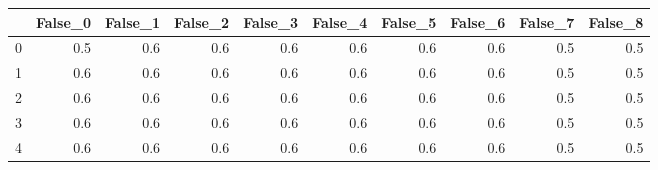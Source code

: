 \begin{tabular}{lrrrrrrrrr}
\toprule
{} &  False\_0 &  False\_1 &  False\_2 &  False\_3 &  False\_4 &  False\_5 &  False\_6 &  False\_7 &  False\_8 \\ \hline
\midrule
0 &      0.5 &      0.6 &      0.6 &      0.6 &      0.6 &      0.6 &      0.6 &      0.5 &      0.5 \\ \hline
1 &      0.6 &      0.6 &      0.6 &      0.6 &      0.6 &      0.6 &      0.6 &      0.5 &      0.5 \\ \hline
2 &      0.6 &      0.6 &      0.6 &      0.6 &      0.6 &      0.6 &      0.6 &      0.5 &      0.5 \\ \hline
3 &      0.6 &      0.6 &      0.6 &      0.6 &      0.6 &      0.6 &      0.6 &      0.5 &      0.5 \\ \hline
4 &      0.6 &      0.6 &      0.6 &      0.6 &      0.6 &      0.6 &      0.6 &      0.5 &      0.5 \\ \hline
\bottomrule
\end{tabular}
